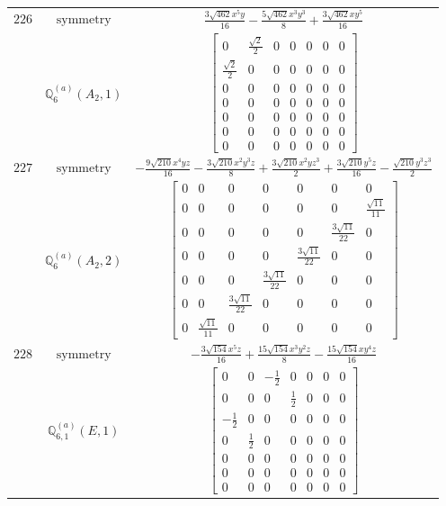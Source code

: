 \documentclass[fleqn,8pt,landscape]{jsarticle}
\begin{document}
\begin{longtable}{ccc}
$ 226 $ & $ \text{symmetry} $ & $ \frac{3 \sqrt{462} x^{5} y}{16} - \frac{5 \sqrt{462} x^{3} y^{3}}{8} + \frac{3 \sqrt{462} x y^{5}}{16} $ \\
$  $ & $ \mathbb{Q}_{6}^{(a)}(A_{2},1) $ & $ \begin{bmatrix} 0 & \frac{\sqrt{2}}{2} & 0 & 0 & 0 & 0 & 0 \\ \frac{\sqrt{2}}{2} & 0 & 0 & 0 & 0 & 0 & 0 \\ 0 & 0 & 0 & 0 & 0 & 0 & 0 \\ 0 & 0 & 0 & 0 & 0 & 0 & 0 \\ 0 & 0 & 0 & 0 & 0 & 0 & 0 \\ 0 & 0 & 0 & 0 & 0 & 0 & 0 \\ 0 & 0 & 0 & 0 & 0 & 0 & 0 \end{bmatrix} $ \\ \hline
$ 227 $ & $ \text{symmetry} $ & $ - \frac{9 \sqrt{210} x^{4} y z}{16} - \frac{3 \sqrt{210} x^{2} y^{3} z}{8} + \frac{3 \sqrt{210} x^{2} y z^{3}}{2} + \frac{3 \sqrt{210} y^{5} z}{16} - \frac{\sqrt{210} y^{3} z^{3}}{2} $ \\
$  $ & $ \mathbb{Q}_{6}^{(a)}(A_{2},2) $ & $ \begin{bmatrix} 0 & 0 & 0 & 0 & 0 & 0 & 0 \\ 0 & 0 & 0 & 0 & 0 & 0 & \frac{\sqrt{11}}{11} \\ 0 & 0 & 0 & 0 & 0 & \frac{3 \sqrt{11}}{22} & 0 \\ 0 & 0 & 0 & 0 & \frac{3 \sqrt{11}}{22} & 0 & 0 \\ 0 & 0 & 0 & \frac{3 \sqrt{11}}{22} & 0 & 0 & 0 \\ 0 & 0 & \frac{3 \sqrt{11}}{22} & 0 & 0 & 0 & 0 \\ 0 & \frac{\sqrt{11}}{11} & 0 & 0 & 0 & 0 & 0 \end{bmatrix} $ \\ \hline
$ 228 $ & $ \text{symmetry} $ & $ - \frac{3 \sqrt{154} x^{5} z}{16} + \frac{15 \sqrt{154} x^{3} y^{2} z}{8} - \frac{15 \sqrt{154} x y^{4} z}{16} $ \\
$  $ & $ \mathbb{Q}_{6,1}^{(a)}(E,1) $ & $ \begin{bmatrix} 0 & 0 & - \frac{1}{2} & 0 & 0 & 0 & 0 \\ 0 & 0 & 0 & \frac{1}{2} & 0 & 0 & 0 \\ - \frac{1}{2} & 0 & 0 & 0 & 0 & 0 & 0 \\ 0 & \frac{1}{2} & 0 & 0 & 0 & 0 & 0 \\ 0 & 0 & 0 & 0 & 0 & 0 & 0 \\ 0 & 0 & 0 & 0 & 0 & 0 & 0 \\ 0 & 0 & 0 & 0 & 0 & 0 & 0 \end{bmatrix} $ \\ \hline

\end{longtable}
\end{document}

